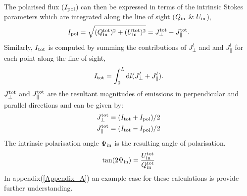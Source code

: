 \documentclass[usenatbib]{mnras}
\newcommand{\Andrew}[1]{\textcolor{dg}{#1}}
\newcommand{\Vasu}[1]{{\color{purple}#1}}
\begin{document}
The polarised flux ($I_{\rm pol}$) can then be expressed in terms of the intrinsic Stokes parameters which are integrated along the line of sight (${Q_{\rm in}}$ \& ${U_{\rm in}}$),
\begin{eqnarray} \label{eq_I_pol}
I_{\rm pol} = \sqrt{(Q_{\rm in}^{\rm tot})^2+(U_{\rm in}^{\rm tot})^2} = J_{\perp}^{\rm tot} - J_{\parallel}^{\rm tot}.
\end{eqnarray}
Similarly, $I_{\rm tot}$ is computed by summing the contributions of $J_{\perp}^l$ and and $J_{\parallel}^l$ for each point along the line of sight,
\begin{equation} \label{eq_I_tot}
    I_{\rm tot} = \int_0^L \mathrm{d}l (J_{\perp}^l + J_{\parallel}^l).
\end{equation}
$J_{\perp}^{\rm tot}$ and $J_{\parallel}^{\rm tot}$ are the resultant magnitudes of emissions in perpendicular and parallel directions and can be given by:
\begin{eqnarray}
J_{\perp}^{\rm tot} = (I_{\rm tot} + I_{\rm pol})/2 \\
J_{\parallel}^{\rm tot} = (I_{\rm tot} - I_{\rm pol})/2 
\end{eqnarray}
The intrinsic polarisation angle $\Psi_{\rm in}$ is the resulting angle of polarisation.%
\begin{eqnarray}
\tan(2\Psi_{\rm in}) = \frac{U_{\rm in}^{\rm tot}}{Q_{\rm in}^{\rm tot}} 
\end{eqnarray}
In appendix(\ref{Appendix_A}) an example case for these calculations is provide further understanding.

\end{document}
